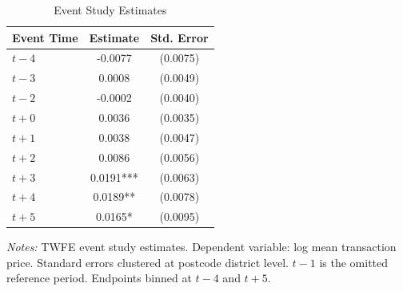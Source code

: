 \begin{table}[htbp]
\centering
\caption{Event Study Estimates}
\label{tab:eventstudy}
\begin{tabular}{lcc}
\toprule
Event Time & Estimate & Std. Error \\
\midrule
$t-4$ & -0.0077 & (0.0075) \\
$t-3$ & 0.0008 & (0.0049) \\
$t-2$ & -0.0002 & (0.0040) \\
$t+0$ & 0.0036 & (0.0035) \\
$t+1$ & 0.0038 & (0.0047) \\
$t+2$ & 0.0086 & (0.0056) \\
$t+3$ & 0.0191*** & (0.0063) \\
$t+4$ & 0.0189** & (0.0078) \\
$t+5$ & 0.0165* & (0.0095) \\
\bottomrule
\end{tabular}
\begin{tablenotes}[flushleft]\small
\item \textit{Notes:} TWFE event study estimates. Dependent variable: log mean transaction price. Standard errors clustered at postcode district level. $t-1$ is the omitted reference period. Endpoints binned at $t-4$ and $t+5$.
\end{tablenotes}
\end{table}

